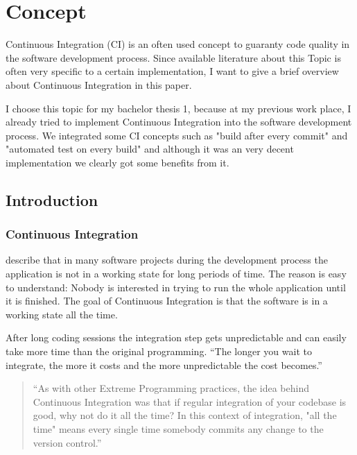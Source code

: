 \section*{Concept}
Continuous Integration (CI) is an often used concept to guaranty code quality in the software development process. Since available literature about this Topic is often very specific to a certain implementation, I want to give a brief overview about Continuous Integration in this paper.

\bigskip

\noindent I choose this topic for my bachelor thesis 1, because at my previous work place, I already tried to implement Continuous Integration into the software development process. We integrated some CI concepts such as "build after every commit" and "automated test on every build" and although it was an very decent implementation we clearly got some benefits from it.

\subsection*{Introduction}

\subsubsection*{Continuous Integration}

\textcite{Humble2010} describe that in many software projects during the development process the application is not in a working state for long periods of time. The reason is easy to understand: Nobody is interested in trying to run the whole application until it is finished. The goal of Continuous Integration is that the software is in a working state all the time.

After long coding sessions the integration step gets unpredictable and can easily take more time than the original programming. ``The longer you wait to integrate, the more it costs and the more unpredictable the cost becomes.'' \autocite{Beck2004}

\begin{quote}
``As with other Extreme Programming practices, the idea behind Continuous Integration was that if regular integration of your codebase is good, why not do it all the time? In this context of integration, "all the time" means every single time somebody commits any change to the version control.'' \autocite{Beck2004}
\end{quote}

